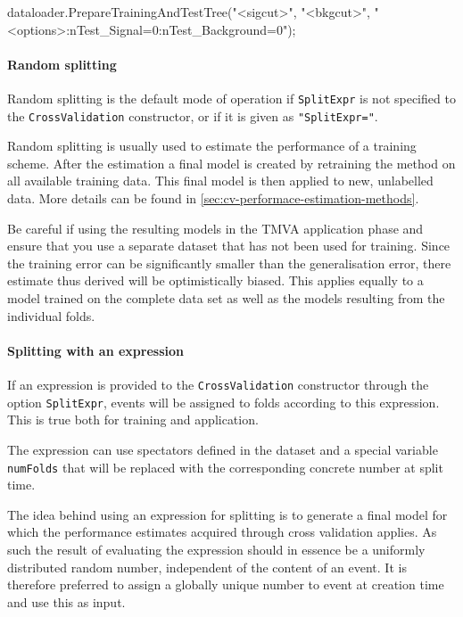 \begin{codeexample}
\begin{tmvacode}
dataloader.PrepareTrainingAndTestTree("<sigcut>", "<bkgcut>",
   "<options>:nTest_Signal=0:nTest_Background=0");
\end{tmvacode}
\caption[.]{\codeexampleCaptionSize }
\label{code:cv-prepare-dataset}
\end{codeexample}

\paragraph{Random splitting}
Random splitting is the default mode of operation if \texttt{SplitExpr} is not specified to the \texttt{CrossValidation} constructor, or if it is given as \texttt{"SplitExpr="}.

Random splitting is usually used to estimate the performance of a training scheme. After the estimation a final model is created by retraining the method on all available training data. This final model is then applied to new, unlabelled data. More details can be found in \ref{sec:cv-performace-estimation-methods}.

Be careful if using the resulting models in the TMVA application phase and ensure that you use a separate dataset that has not been used for training. Since the training error can be significantly smaller than the generalisation error, there estimate thus derived will be optimistically biased. This applies equally to a model trained on the complete data set as well as the models resulting from the individual folds.

\paragraph{Splitting with an expression}
If an expression is provided to the \texttt{CrossValidation} constructor through the option \texttt{SplitExpr}, events will be assigned to folds according to this expression. This is true both for training and application.

The expression can use spectators defined in the dataset and a special variable \texttt{numFolds} that will be replaced with the corresponding concrete number at split time.

The idea behind using an expression for splitting is to generate a final model for which the performance estimates acquired through cross validation applies. As such the result of evaluating the expression should in essence be a uniformly distributed random number, independent of the content of an event. It is therefore preferred to assign a globally unique number to event at creation time and use this as input. 


